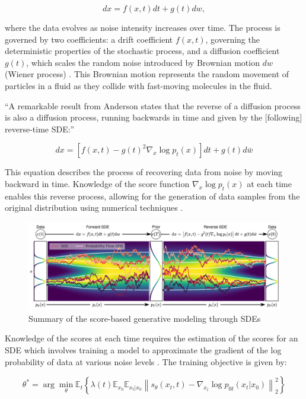 \[ dx = f(x, t)dt + g(t)dw, \]

\citep{yangdiffusionSummary} where the data evolves as noise intensity increases over time. The process is governed by two coefficients: a drift coefficient \( f(x, t) \), governing the deterministic properties of the stochastic process, and a diffusion coefficient \( g(t) \), which scales the random noise introduced by Brownian motion \( dw \) (Wiener process) \citep{song2020score}. This Brownian motion represents the random movement of particles in a fluid as they collide with fast-moving molecules in the fluid. 

``A remarkable result from Anderson \citep{anderson1982313} states that the reverse of a diffusion process is also a diffusion process, running backwards in time and given by the [following] reverse-time SDE:\@'' \citep{song2020score}

\[ dx = \left[ f(x, t) - g(t)^2 \nabla_x \log p_t(x) \right] dt + g(t)d\bar{w} \]

This equation describes the process of recovering data from noise by moving backward in time. Knowledge of the score function \( \nabla_x \log p_t(x) \) at each time enables this reverse process, allowing for the generation of data samples from the original distribution using numerical techniques \citep{song2020score}.

\begin{figure}[ht]
  \centering
    \includegraphics[width=1\columnwidth]{figures/DiffusionModels_SDEs.png}
    \caption{Summary of the score-based generative modeling through SDEs \citep{song2020score}}\label{fig:DM_SDEs}
\end{figure}

Knowledge of the scores at each time requires the estimation of the scores for an SDE which involves training a model to approximate the gradient of the log probability of data at various noise levels \citep{song2020score}. The training objective is given by:

\[
\theta^* = \arg\min_\theta \mathbb{E}_t \left\{ \lambda(t) \mathbb{E}_{x_0} \mathbb{E}_{x_t|x_0} \left\| s_\theta(x_t, t) - \nabla_{x_t} \log p_{0t}(x_t | x_0) \right\|_2^2 \right\}
\]

